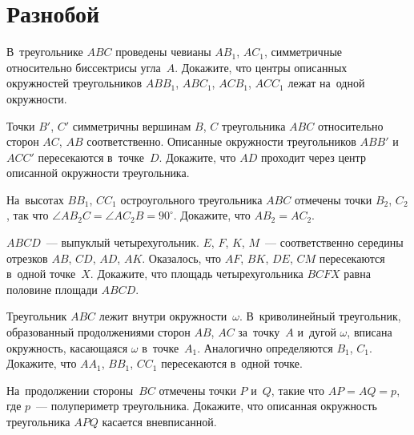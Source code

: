 

\section*{Разнобой}


\begin{problems}

\item
В~треугольнике $ABC$ проведены чевианы $A B_1$, $A C_1$, симметричные
относительно биссектрисы угла~$A$.
Докажите, что центры описанных окружностей треугольников $A B B_1$, $A B C_1$,
$A C B_1$, $A C C_1$ лежат на~одной окружности.

\item
Точки $B'$, $C'$ симметричны вершинам $B$, $C$ треугольника $ABC$ относительно
сторон $AC$, $AB$ соответственно.
Описанные окружности треугольников $ABB'$ и~$ACC'$ пересекаются в~точке~$D$.
Докажите, что $AD$ проходит через центр описанной окружности треугольника.

\item
На~высотах $B B_1$, $C C_1$ остроугольного треугольника $ABC$ отмечены точки
$B_2$, $C_2$, так что $\angle A B_2 C = \angle A C_2 B = 90^{\circ}$.
Докажите, что $A B_2 = A C_2$.

\item
$ABCD$~--- выпуклый четырехугольник.
$E$, $F$, $K$, $M$~--- соответственно середины отрезков $AB$, $CD$, $AD$, $AK$.
Оказалось, что $AF$, $BK$, $DE$, $CM$ пересекаются в~одной точке~$X$.
Докажите, что площадь четырехугольника $BCFX$ равна половине площади $ABCD$.

\item
Треугольник $ABC$ лежит внутри окружности~$\omega$.
В~криволинейный треугольник, образованный продолжениями сторон $AB$, $AC$
за~точку~$A$ и~дугой $\omega$, вписана окружность, касающаяся $\omega$
в~точке~$A_1$.
Аналогично определяются $B_1$, $C_1$.
Докажите, что $A A_1$, $B B_1$, $C C_1$ пересекаются в~одной точке.

\item
На~продолжении стороны~$BC$ отмечены точки $P$ и~$Q$, такие что $AP = AQ = p$,
где $p$~--- полупериметр треугольника.
Докажите, что описанная окружность треугольника $APQ$ касается вневписанной.

\end{problems}

